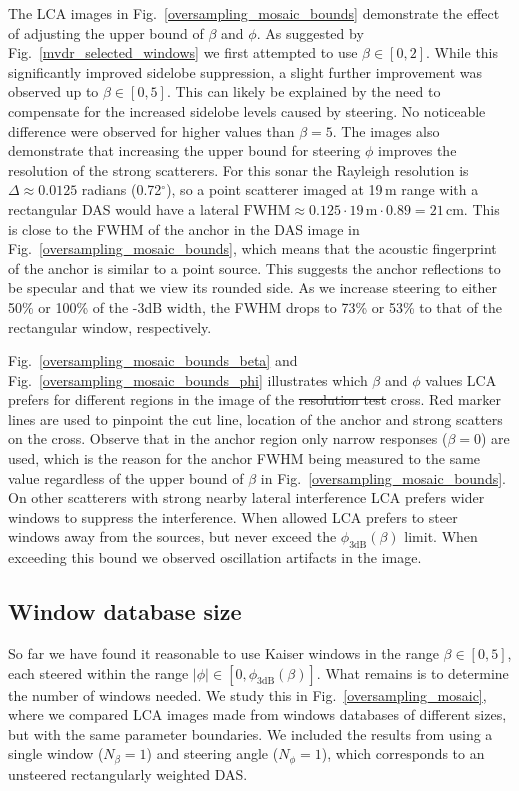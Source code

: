 \documentclass[10pt,journal,draftclsnofoot,onecolumn]{IEEEtran}
\newcommand\Fig[1]{Fig.~\ref{#1}}
\newcommand\1{\vec 1}
\providecommand{\DIFdel}[1]{{\protect\color{red}\sout{#1}}}                      %
\providecommand{\DIFdelbegin}{} %
\providecommand{\DIFdelend}{} %
\begin{document}
The LCA images in \Fig{oversampling_mosaic_bounds} demonstrate the effect of adjusting the upper bound of $\beta$ and $\phi$. As suggested by \Fig{mvdr_selected_windows} we first attempted to use $\beta\in[0,2]$. While this significantly improved sidelobe suppression, a slight further improvement was observed up to $\beta\in[0,5]$. This can likely be explained by the need to compensate for the increased sidelobe levels caused by steering. No noticeable difference were observed for higher values than $\beta=5$. The images also demonstrate that increasing the upper bound for steering $\phi$ improves the resolution of the strong scatterers. For this sonar the Rayleigh resolution is $\Delta\approx0.0125$ radians (0.72$^\circ$), so a point scatterer imaged at 19\,m range with a rectangular DAS would have a lateral $\text{FWHM}\approx0.125\cdot19\,\text{m}\cdot0.89=21\,\text{cm}$. This is close to the FWHM of the anchor in the DAS image in \Fig{oversampling_mosaic_bounds}, which means that the acoustic fingerprint of the anchor is similar to a point source. This suggests the anchor reflections to be specular and that we view its rounded side. As we increase steering to either 50\% or 100\% of the -3dB width, the FWHM drops to 73\% or 53\% to that of the rectangular window, respectively.

\Fig{oversampling_mosaic_bounds_beta} and \Fig{oversampling_mosaic_bounds_phi} illustrates which $\beta$ and $\phi$ values LCA prefers for different regions in the image of the \DIFdelbegin \DIFdel{resolution test }\DIFdelend cross. Red marker lines are used to pinpoint the cut line, location of the anchor and strong scatters on the cross. Observe that in the anchor region only narrow responses ($\beta=0$) are used, which is the reason for the anchor FWHM being measured to the same value regardless of the upper bound of $\beta$ in \Fig{oversampling_mosaic_bounds}. On other scatterers with strong nearby lateral interference LCA prefers wider windows to suppress the interference. When allowed LCA prefers to steer windows away from the sources, but never exceed the $\phi_\text{3dB}(\beta)$ limit. When exceeding this bound we observed oscillation artifacts in the image.


\subsection{Window database size}\label{sec:results_database_size}

So far we have found it reasonable to use Kaiser windows in the range $\beta\in[0,5]$, each steered within the range $|\phi|\in[0,\phi_\mathrm{3dB}(\beta)]$. What remains is to determine the number of windows needed. We study this in \Fig{oversampling_mosaic}, where we compared LCA images made from windows databases of different sizes, but with the same parameter boundaries. We included the results from using a single window ($N_\beta=1$) and steering angle ($N_\phi=1$), which corresponds to an unsteered rectangularly weighted DAS.
\end{document}
